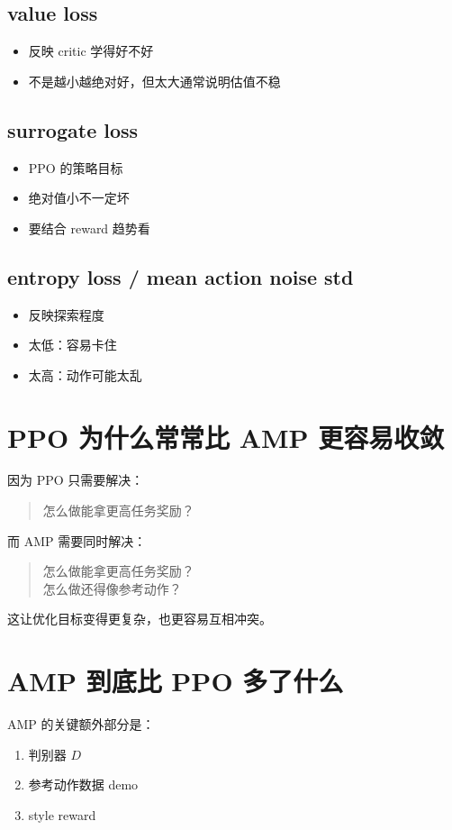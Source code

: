 \documentclass[11pt,a4paper]{article}
\begin{document}
\subsection*{value loss}
\begin{itemize}
\item 反映 critic 学得好不好
\item 不是越小越绝对好，但太大通常说明估值不稳
\end{itemize}

\subsection*{surrogate loss}
\begin{itemize}
\item PPO 的策略目标
\item 绝对值小不一定坏
\item 要结合 reward 趋势看
\end{itemize}

\subsection*{entropy loss / mean action noise std}
\begin{itemize}
\item 反映探索程度
\item 太低：容易卡住
\item 太高：动作可能太乱
\end{itemize}

\section{PPO 为什么常常比 AMP 更容易收敛}
因为 PPO 只需要解决：
\begin{quote}
怎么做能拿更高任务奖励？
\end{quote}

而 AMP 需要同时解决：
\begin{quote}
怎么做能拿更高任务奖励？\\
怎么做还得像参考动作？
\end{quote}

这让优化目标变得更复杂，也更容易互相冲突。

\section{AMP 到底比 PPO 多了什么}
AMP 的关键额外部分是：
\begin{enumerate}
\item 判别器 $D$
\item 参考动作数据 demo
\item style reward
\end{enumerate}
\end{document}
